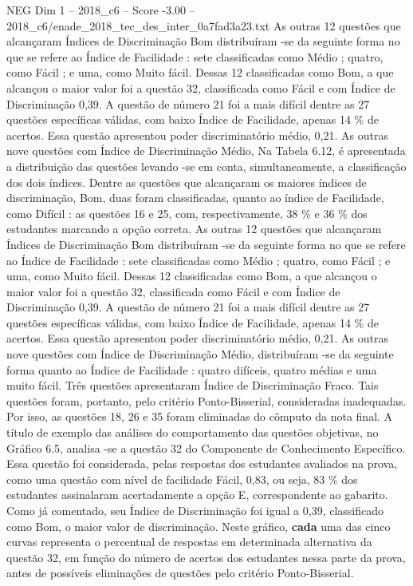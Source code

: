 \begin{textsample}{NEG Dim 1 – 2018\_c6 – Score -3.00 – 2018\_c6/enade\_2018\_tec\_des\_inter\_0a7fad3a23.txt}
As outras 12 questões que alcançaram Índices de Discriminação Bom distribuíram -se da seguinte forma no que se refere ao Índice de Facilidade : sete classificadas como Médio ; quatro, como Fácil ; e uma, como Muito fácil.
Dessas 12 classificadas como Bom, a que alcançou o maior valor foi a questão 32, classificada como Fácil e com Índice de Discriminação 0,39.
A questão de número 21 foi a mais difícil dentre as 27 questões específicas válidas, com baixo Índice de Facilidade, apenas 14 \% de acertos.
Essa questão apresentou poder discriminatório médio, 0,21.
As outras nove questões com Índice de Discriminação Médio, Na Tabela 6.12, é apresentada a distribuição das questões levando -se em conta, simultaneamente, a classificação dos dois índices.
Dentre as questões que alcançaram os maiores índices de discriminação, Bom, duas foram classificadas, quanto ao índice de Facilidade, como Difícil : as questões 16 e 25, com, respectivamente, 38 \% e 36 \% dos estudantes marcando a opção correta.
As outras 12 questões que alcançaram Índices de Discriminação Bom distribuíram -se da seguinte forma no que se refere ao Índice de Facilidade : sete classificadas como Médio ; quatro, como Fácil ; e uma, como Muito fácil.
Dessas 12 classificadas como Bom, a que alcançou o maior valor foi a questão 32, classificada como Fácil e com Índice de Discriminação 0,39.
A questão de número 21 foi a mais difícil dentre as 27 questões específicas válidas, com baixo Índice de Facilidade, apenas 14 \% de acertos.
Essa questão apresentou poder discriminatório médio, 0,21.
As outras nove questões com Índice de Discriminação Médio, distribuíram -se da seguinte forma quanto ao Índice de Facilidade : quatro difíceis, quatro médias e uma muito fácil.
Três questões apresentaram Índice de Discriminação Fraco.
Tais questões foram, portanto, pelo critério Ponto-Bisserial, consideradas inadequadas.
Por isso, as questões 18, 26 e 35 foram eliminadas do cômputo da nota final.
A título de exemplo das análises do comportamento das questões objetivas, no Gráfico 6.5, analisa -se a questão 32 do Componente de Conhecimento Específico.
Essa questão foi considerada, pelas respostas dos estudantes avaliados na prova, como uma questão com nível de facilidade Fácil, 0,83, ou seja, 83 \% dos estudantes assinalaram acertadamente a opção E, correspondente ao gabarito.
Como já comentado, seu Índice de Discriminação foi igual a 0,39, classificado como Bom, o maior valor de discriminação.
Neste gráfico, \textbf{cada} uma das cinco curvas representa o percentual de respostas em determinada alternativa da questão 32, em função do número de acertos dos estudantes nessa parte da prova, antes de possíveis eliminações de questões pelo critério Ponto-Bisserial.

\end{textsample}
